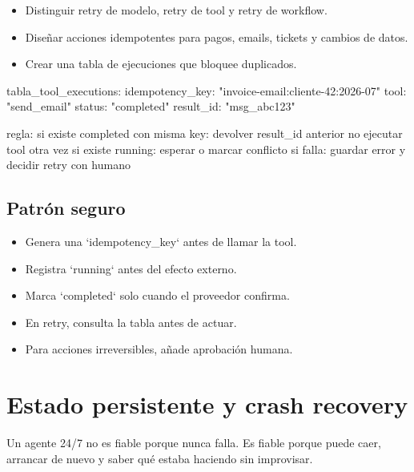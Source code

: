 \documentclass[11pt,a4paper]{book}
\begin{document}
\begin{itemize}\item Distinguir retry de modelo, retry de tool y retry de workflow.\end{itemize}
\begin{itemize}\item Diseñar acciones idempotentes para pagos, emails, tickets y cambios de datos.\end{itemize}
\begin{itemize}\item Crear una tabla de ejecuciones que bloquee duplicados.\end{itemize}
\begin{codebox}
tabla_tool_executions:
  idempotency_key: "invoice-email:cliente-42:2026-07"
  tool: "send_email"
  status: "completed"
  result_id: "msg_abc123"

regla:
  si existe completed con misma key:
    devolver result_id anterior
    no ejecutar tool otra vez
  si existe running:
    esperar o marcar conflicto
  si falla:
    guardar error y decidir retry con humano
\end{codebox}
\section{Patrón seguro}
\begin{itemize}\item Genera una `idempotency\_key` antes de llamar la tool.\end{itemize}
\begin{itemize}\item Registra `running` antes del efecto externo.\end{itemize}
\begin{itemize}\item Marca `completed` solo cuando el proveedor confirma.\end{itemize}
\begin{itemize}\item En retry, consulta la tabla antes de actuar.\end{itemize}
\begin{itemize}\item Para acciones irreversibles, añade aprobación humana.\end{itemize}
\chapter{Estado persistente y crash recovery}
Un agente 24/7 no es fiable porque nunca falla. Es fiable porque puede caer, arrancar de nuevo y saber qué estaba haciendo sin improvisar.
\end{document}
